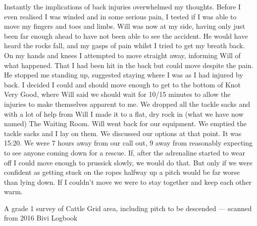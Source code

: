     Instantly the implications of back injuries overwhelmed my thoughts. Before I even realised I was winded and in some serious pain, I tested if I was able to move my fingers and toes and limbs. Will was now at my side, having only just been far enough ahead to have not been able to see the accident. He would have heard the rocks fall, and my gasps of pain whilst I tried to get my breath back. On my hands and knees I attempted to move straight away, informing Will of what happened. That I had been hit in the back but could move despite the pain. He stopped me standing up, suggested staying where I was as I had injured by back. I decided I could and should move enough to get to the bottom of Knot Very Good, where Will said we should wait for 10/15 minutes to allow the injuries to make themselves apparent to me. We dropped all the tackle sacks and with a lot of help from Will I made it to a flat, dry rock in (what we have now named) The Waiting Room. Will went back for our equipment. We emptied the tackle sacks and I lay on them. We discussed our options at that point. It was 15:20. We were 7 hours away from our call out, 9 away from reasonably expecting to see anyone coming down for a rescue. If, after the adrenaline started to wear off I could move enough to prussick slowly, we would do that. But only if we were confident as getting stuck on the ropes halfway up a pitch would be far worse than lying down. If I couldn’t move we were to stay together and keep each other warm.

    \begin{survey}[t]
        \checkoddpage \ifoddpage \forcerectofloat \else \forceversofloat \fi
        \centering
        \caption[Cattle Grid (Grade 1)]{A grade 1 survey of Cattle Grid area, including pitch to be descended --- scanned from 2016 Bivi Logbook}
        \label{Cattlegrid}
    \end{survey}

